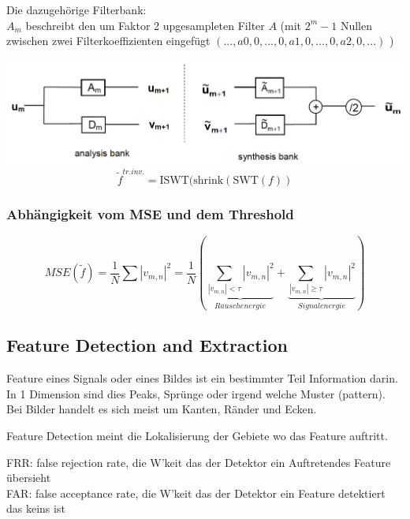 \begin{minipage}[l]{0.5\textwidth}
	Die dazugehörige Filterbank: \\
	$A_m$ beschreibt den um Faktor 2 upgesampleten Filter $A$ (mit $2^m -1$ Nullen zwischen zwei Filterkoeffizienten eingefügt $(...,a0,0,...,0,a1,0,...,0,a2,0,...)$ )
\end{minipage}
\begin{minipage}[r]{0.5\textwidth}
	\flushright
	\includegraphics[width=.9\textwidth]{content/swtFilterbank.pdf}
	\[ \tilde{f}^{tr.inv.}=\mathrm{ISWT}(\mathrm{shrink}(\mathrm{SWT}(f)) \]
\end{minipage}


\subsubsection{Abhängigkeit vom MSE und dem Threshold}
\[ MSE(\tilde{f}) = \frac{1}{N} \sum |v_{m,n}|^2 = \frac{1}{N}\left(\underbrace{\sum_{|v_{m,n}| < \tau}|v_{m,n}|^2}_{Rauschenergie} + \underbrace{\sum_{|v_{m,n}| \geq \tau}|v_{m,n}|^2}_{Signalenergie}\right) \]


\subsection{Feature Detection and Extraction}

Feature eines Signals oder eines Bildes ist ein bestimmter Teil Information darin. In 1 Dimension sind dies Peaks, Sprünge oder irgend welche Muster (pattern). Bei Bilder handelt es sich meist um Kanten, Ränder und Ecken.

Feature Detection meint die Lokalisierung der Gebiete wo das Feature auftritt.

FRR: false rejection rate, die W'keit das der Detektor ein Auftretendes Feature übersieht\\
FAR: false acceptance rate, die W'keit das der Detektor ein Feature detektiert das keins ist

